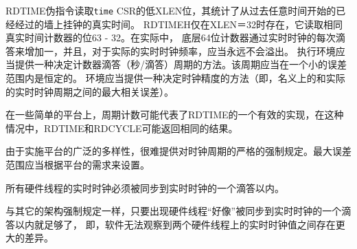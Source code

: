 RDTIME伪指令读取{\tt time} CSR的低XLEN位，其统计了从过去任意时间开始的已经经过的墙上挂钟的真实时间。
RDTIMEH仅在XLEN＝32时存在，它读取相同真实时间计数器的位63 - 32。在实际中，
底层64位计数器通过实时时钟的每次滴答来增加一，并且，对于实际的实时时钟频率，应当永远不会溢出。
执行环境应当提供一种决定计数器滴答（秒/滴答）周期的方法。该周期应当在一个小的误差范围内是恒定的。
环境应当提供一种决定时钟精度的方法（即，名义上的和实际的实时时钟周期之间的最大相关误差）。

\begin{commentary}
  在一些简单的平台上，周期计数可能代表了RDTIME的一个有效的实现，在这种情况中，RDTIME和RDCYCLE可能返回相同的结果。

  由于实施平台的广泛的多样性，很难提供对时钟周期的严格的强制规定。最大误差范围应当根据平台的需求来设置。
\end{commentary}

所有硬件线程的实时时钟必须被同步到实时时钟的一个滴答以内。

\begin{commentary}
  与其它的架构强制规定一样，只要出现硬件线程“好像”被同步到实时时钟的一个滴答以内就足够了，
  即，软件无法观察到两个硬件线程上的实时时钟值之间存在更大的差异。
\end{commentary}

